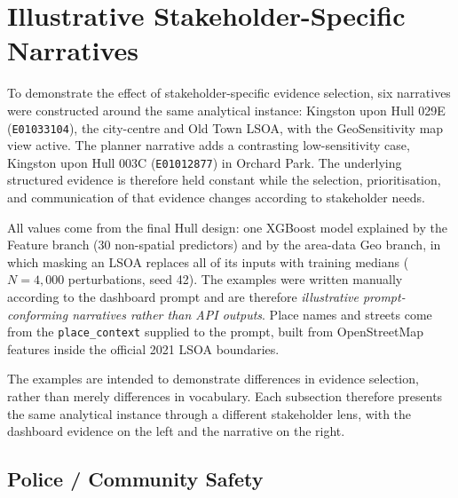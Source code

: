 \section{Illustrative Stakeholder-Specific Narratives}
\label{SEC:stakeholder_narrative_examples}

To demonstrate the effect of stakeholder-specific evidence selection, six
narratives were constructed around the same analytical instance: Kingston upon
Hull 029E (\texttt{E01033104}), the city-centre and Old Town LSOA, with the
GeoSensitivity map view active. The planner narrative adds a contrasting
low-sensitivity case, Kingston upon Hull 003C (\texttt{E01012877}) in Orchard
Park. The underlying structured evidence is therefore held constant while the
selection, prioritisation, and communication of that evidence changes
according to stakeholder needs.

All values come from the final Hull design: one XGBoost model explained by
the Feature branch (30 non-spatial predictors) and by the area-data Geo branch,
in which masking an LSOA replaces all of its inputs with training medians
($N=4{,}000$ perturbations, seed 42). The examples were written manually
according to the dashboard prompt and are therefore \emph{illustrative
prompt-conforming narratives rather than API outputs}. Place names and
streets come from the \texttt{place\_context} supplied to the prompt, built
from OpenStreetMap features inside the official 2021 LSOA boundaries.

The examples are intended to demonstrate differences in evidence selection,
rather than merely differences in vocabulary. Each subsection therefore
presents the same analytical instance through a different stakeholder lens,
with the dashboard evidence on the left and the narrative on the right.



\subsection{Police / Community Safety}

